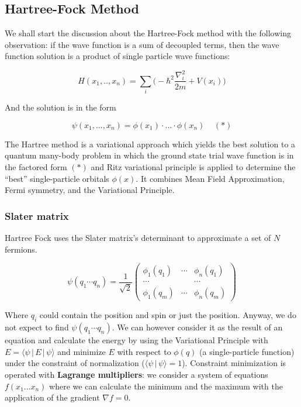 	\subsection{Hartree-Fock Method}
	We shall start the discussion about the Hartree-Fock method with the following observation: if the wave function is a sum of decoupled terms, then the wave function solution is a product of single particle wave functions:

	$$H(x_1,.., x_n) = \sum_i \bigg(-\hbar^2 \frac{\nabla_i^2}{2m} + V(x_i) \bigg)$$

	And the solution is in the form

	$$\psi(x_1, ..., x_n) = \phi(x_1) \cdot ... \cdot \phi(x_n) \;\;\;\; (*)$$

	The Hartree method is a variational approach which yields the best solution to a quantum many-body problem in which the ground state trial wave function is in the factored form $(*)$ and Ritz variational principle is applied to determine the “best” single-particle orbitals $\phi(x)$.
	It combines Mean Field Approximation, Fermi symmetry, and the Variational Principle.

		\subsubsection{Slater matrix}
		Hartree Fock uses the Slater matrix's determinant to approximate a set of $N$ fermions.

		$$\psi(q_1\cdots q_n)=\frac{1}{\sqrt{2}}\begin{pmatrix}\phi_1(q_1)&\cdots&\phi_n(q_1)\\\cdots & &\cdots\\\phi_1(q_m)&\cdots&\phi_n(q_m)\end{pmatrix}$$

		Where $q_i$ could contain the position and spin or just the position. Anyway, we do not expect to find $\psi(q_1\cdots q_n)$.
		We can however consider it as the result of an equation and calculate the energy by using the Variational Principle with $E=\langle \psi\,|\,E\,|\,\psi \rangle$ and minimize $E$ with respect to $\phi(q)$ (a single-particle function) under the constraint of normalization ($\langle \psi\,|\,\psi \rangle =1$).
		Constraint minimization is operated with \textbf{Lagrange multipliers}: we consider a system of equations $f(x_1...x_n)$ where we can calculate the minimum and the maximum with the application of the gradient $\nabla f=0$.\\

